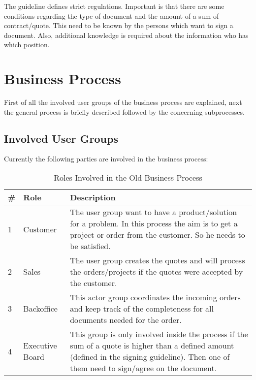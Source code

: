 The guideline defines strict regulations. Important is that there are some conditions regarding the type of document and the amount of a sum of contract/quote. This need to be known by the persons which want to sign a document. Also, additional knowledge is required about the information who has which position.

\section{Business Process} \label{sec:bp}
First of all the involved user groups of the business process are explained, next the general process is briefly described followed by the concerning subprocesses.

\subsection{Involved User Groups}
Currently the following parties are involved in the business process: 
\begin{table}[h]
	\begin{tabular}{|p{0.25cm}|p{2cm}|p{14cm}|} \hline
		\rowcolor{Gray}\# & Role & Description \\ \hline
		1 & Customer & The user group want to have a product/solution for a problem. In this process the aim is to get a project or order from the customer. So he needs to be satisfied. \\ \hline
		2 & Sales & The user group creates the quotes and will process the orders/projects if the quotes were accepted by the customer. \\ \hline
		3 & Backoffice & This actor group coordinates the incoming orders and keep track of the completeness for all documents needed for the order. \\ \hline
		4 & Executive Board & This group is only involved inside the process if the sum of a quote is higher than a defined amount (defined in the signing guideline). Then one of them need to sign/agree on the document. \\ \hline
	\end{tabular}
	\caption{Roles Involved in the Old Business Process}
	\label{tab:bpRoles}
\end{table}

